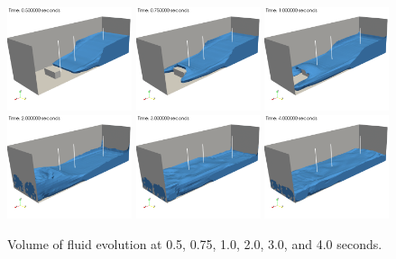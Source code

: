\documentclass{article}
\begin{document}
\begin{figure}[!htbp]
  \centering
  {
   \includegraphics[height=1.2in]{images/results_0p50sec.png}
  }
  \centering
  {
   \includegraphics[height=1.2in]{images/results_0p75sec.png}
  }
  \centering
  {
   \includegraphics[height=1.2in]{images/results_1p0sec.png}
  } \\
  \centering
  {
   \includegraphics[height=1.2in]{images/results_2p0sec.png}
  }
  \centering
  {
   \includegraphics[height=1.2in]{images/results_3p0sec.png}
  }
  \centering
  {
   \includegraphics[height=1.2in]{images/results_4p0sec.png}
  }
  \caption{Volume of fluid evolution at 0.5, 0.75, 1.0, 2.0, 3.0, and 4.0 seconds.}
  \label{fig:results}
\end{figure}
\end{document}
